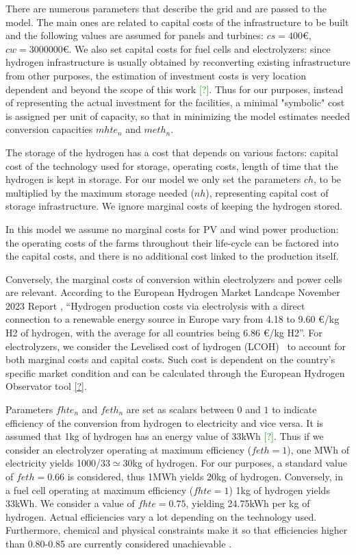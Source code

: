 There are numerous parameters that describe the grid and are passed to the model. 
The main ones are related to capital costs of the infrastructure to be built and the following values are assumed for panels and turbines: $cs = 400$\euro, $cw = 3 000 000$\euro. 
We also set capital costs for fuel cells and electrolyzers: since hydrogen infrastructure is usually obtained by reconverting existing infrastructure from other purposes, the estimation of investment costs is very location dependent and beyond the scope of this work \textcolor{green}{[?]}. 
Thus for our purposes, instead of representing the actual investment for the facilities, a minimal "symbolic" cost is assigned per unit of capacity, so that in minimizing the model estimates needed conversion capacities $mhte_n$ and $meth_n$.

The storage of the hydrogen has a cost that depends on various factors: capital cost of the technology used for storage, operating costs, length of time that the hydrogen is kept in storage.
For our model we only set the parameters $ch$, to be multiplied by the maximum storage needed ($nh$), representing capital cost of storage infrastructure. 
We ignore marginal costs of keeping the hydrogen stored.

In this model we assume no marginal costs for PV and wind power production: the operating costs of the farms throughout their life-cycle can be factored into the capital costs, and there is no additional cost linked to the production itself.

Conversely, the marginal costs of conversion within electrolyzers and power cells are relevant. 
According to the European Hydrogen Market Landcape November 2023 Report \textcolor{green}{\cite{European_H2_Market_landscape}}, ``Hydrogen production costs via electrolysis with a direct connection to a renewable energy source in Europe vary from 4.18 to 9.60 €/kg H2 of hydrogen, with the average for all countries being 6.86 €/kg H2''. 
For electrolyzers, we consider the Levelised cost of hydrogen (LCOH)  to account for both marginal costs and capital costs. 
Such cost is dependent on the country's specific market condition and can be calculated through the European Hydrogen Observator tool \textcolor{green}{\href{https://observatory.clean-hydrogen.europa.eu/tools-reports/levelised-cost-hydrogen-calculator}{[?]}}.

Parameters $fhte_n$ and $feth_n$ are set as scalars between $0$ and $1$ to indicate efficiency of the conversion from hydrogen to electricity and vice versa. 
It is assumed that 1kg of hydrogen has an energy value of 33kWh \textcolor{green}{[?]}. 
Thus if we consider an electrolyzer operating at maximum efficiency ($feth=1$), one MWh of electricity yields 1000/33$\simeq$30kg of hydrogen. 
For our purposes, a standard value of $feth=0.66$ is considered, thus 1MWh yields 20kg of hydrogen. 
Conversely, in a fuel cell operating at maximum efficiency ($fhte=1$) 1kg of hydrogen yields 33kWh. 
We consider a value of $fhte=0.75$, yielding 24.75kWh per kg of hydrogen. Actual efficiencies vary a lot depending on the technology used. 
Furthermore, chemical and physical constraints make it so that efficiencies higher than 0.80-0.85 are currently considered unachievable \cite{DAWOOD}.

